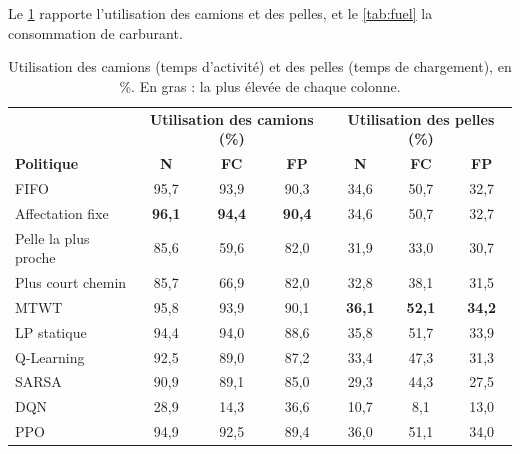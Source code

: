 \documentclass[11pt,a4paper]{article}
\newif\ifrevmarks
\newcommand{\revtag}[1]{\ifrevmarks\textsuperscript{\textcolor{red!70!black}{\scriptsize[#1]}}\fi}
\newenvironment{revbloc}[1]{\par\ifrevmarks\color{revcolor}\noindent\revtag{#1}\ \fi}{\par}
\newif\ifcorrmarks
\newcommand{\corr}[1]{\ifcorrmarks\textcolor{corrcolor}{#1}\else#1\fi}
\begin{document}
\begin{revbloc}{T31}
Le \cref{tab:efficiency} rapporte l'utilisation des camions et des pelles, et le \cref{tab:fuel} la consommation de carburant.

\begin{table}[H]
\centering
\caption{Utilisation des camions (temps d'activité) et des pelles (temps de chargement), en \%. En gras : la plus élevée de chaque colonne.}
\label{tab:efficiency}
\footnotesize\setlength{\tabcolsep}{4pt}
\begin{tabular}{lccc|ccc}
\toprule
 & \multicolumn{3}{c|}{\textbf{Utilisation des camions (\%)}} & \multicolumn{3}{c}{\textbf{Utilisation des pelles (\%)}} \\
\textbf{Politique} & \textbf{N} & \textbf{FC} & \textbf{FP} & \textbf{N} & \textbf{FC} & \textbf{FP} \\
\midrule
FIFO                 & 95,7 & 93,9 & 90,3 & 34,6 & 50,7 & 32,7 \\
Affectation fixe     & \textbf{96,1} & \textbf{94,4} & \textbf{90,4} & 34,6 & 50,7 & 32,7 \\
Pelle la plus proche & 85,6 & 59,6 & 82,0 & 31,9 & 33,0 & 30,7 \\
Plus court chemin    & 85,7 & 66,9 & 82,0 & 32,8 & 38,1 & 31,5 \\
MTWT                 & 95,8 & 93,9 & 90,1 & \textbf{36,1} & \textbf{52,1} & \textbf{34,2} \\
\corr{LP statique}                   & 94,4 & 94,0 & 88,6 & 35,8 & 51,7 & 33,9 \\
\midrule
Q-Learning           & 92,5 & 89,0 & 87,2 & 33,4 & 47,3 & 31,3 \\
SARSA                & 90,9 & 89,1 & 85,0 & 29,3 & 44,3 & 27,5 \\
DQN                  & 28,9 & 14,3 & 36,6 & 10,7 & 8,1 & 13,0 \\
PPO                  & 94,9 & 92,5 & 89,4 & 36,0 & 51,1 & 34,0 \\
\bottomrule
\end{tabular}
\end{table}


\end{revbloc}
\end{document}
